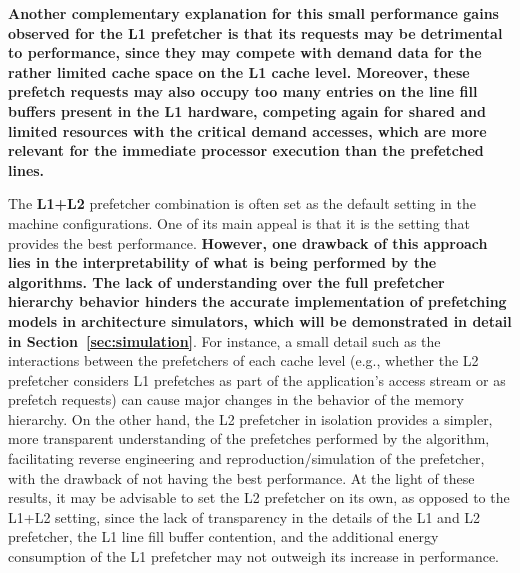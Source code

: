 \documentclass[AMA,final,STIX1COL]{WileyNJD-v2}
\newcommand\new[1]{{\color{red}\textbf{#1}}}
\newcommand{\vsg}[1]{\textcolor{blue}{\bfseries \ul{vsgirelli: #1} }\vspace{0.2cm}}
\newcommand{\fbm}[1]{\textcolor{red}{\bfseries \ul{fbm: #1} }\vspace{0.2cm}}
\begin{document}
\new{Another complementary explanation for this small performance gains observed for the L1 prefetcher is that its requests may be detrimental to performance, since they may compete with demand data for the rather limited cache space on the L1 cache level.
Moreover, these prefetch requests may also occupy too many entries on the line fill buffers present in the L1 hardware, competing again for shared and limited resources with the critical demand accesses, which are more relevant for the immediate processor execution than the prefetched lines.}%

The \new{L1+L2} prefetcher combination is often set as the default setting in the machine configurations.
One of its main appeal is that it is the setting that provides the best performance. 
\new{However, one drawback of this approach lies in the interpretability of what is being performed by the algorithms.
The lack of understanding over the full prefetcher hierarchy behavior hinders the accurate implementation of prefetching models in architecture simulators, which will be demonstrated in detail in Section~\ref{sec:simulation}}.%
For instance, a small detail such as the interactions between the prefetchers of each cache level (e.g., whether the L2 prefetcher considers L1 prefetches as part of the application's access stream or as prefetch requests) can cause major changes in the behavior of the memory hierarchy.
On the other hand, the L2 prefetcher in isolation provides a simpler, more transparent understanding of the prefetches performed by the algorithm, facilitating reverse engineering and reproduction/simulation of the prefetcher, with the drawback of not having the best performance.
At the light of these results, it may be advisable to set the L2 prefetcher on its own, as opposed to the L1+L2 setting, since the lack of transparency in the details of the L1 and L2 prefetcher, the L1 line fill buffer contention, and the additional energy consumption of the L1 prefetcher may not outweigh its increase in performance.
\end{document}

